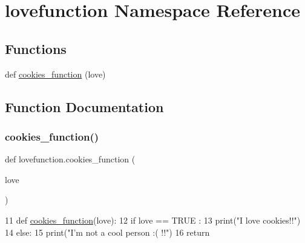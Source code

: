 \hypertarget{namespacelovefunction}{}\section{lovefunction Namespace Reference}
\label{namespacelovefunction}
\subsection*{Functions}
\begin{DoxyCompactItemize}
\item 
def \mbox{\hyperlink{namespacelovefunction_afc4d885108a12295a6f481d4ddf65cc6}{cookies\+\_\+function}} (love)
\end{DoxyCompactItemize}


\subsection{Function Documentation}
\mbox{\label{namespacelovefunction_afc4d885108a12295a6f481d4ddf65cc6}} 
\subsubsection{\texorpdfstring{cookies\+\_\+function()}{cookies\_function()}}
{\footnotesize\ttfamily def lovefunction.\+cookies\+\_\+function (\begin{DoxyParamCaption}\item[{}]{love }\end{DoxyParamCaption})}


\begin{DoxyCode}
11 \textcolor{keyword}{def }\mbox{\hyperlink{namespacelovefunction_afc4d885108a12295a6f481d4ddf65cc6}{cookies\_function}}(love):
12   \textcolor{keywordflow}{if} love == TRUE :
13     print(\textcolor{stringliteral}{"I love cookies!!"})
14   \textcolor{keywordflow}{else}:
15     print(\textcolor{stringliteral}{"I'm not a cool person :( !!"})
16   \textcolor{keywordflow}{return}
\end{DoxyCode}
